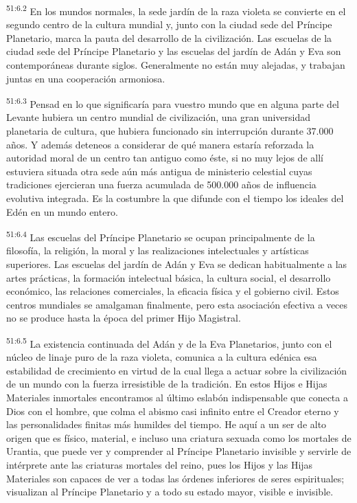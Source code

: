\par
\textsuperscript{51:6.2} En los mundos normales, la sede jardín de la raza violeta se convierte en el segundo centro de la cultura mundial y, junto con la ciudad sede del Príncipe Planetario, marca la pauta del desarrollo de la civilización. Las escuelas de la ciudad sede del Príncipe Planetario y las escuelas del jardín de Adán y Eva son contemporáneas durante siglos. Generalmente no están muy alejadas, y trabajan juntas en una cooperación armoniosa.

\par
\textsuperscript{51:6.3} Pensad en lo que significaría para vuestro mundo que en alguna parte del Levante hubiera un centro mundial de civilización, una gran universidad planetaria de cultura, que hubiera funcionado sin interrupción durante 37.000 años. Y además deteneos a considerar de qué manera estaría reforzada la autoridad moral de un centro tan antiguo como éste, si no muy lejos de allí estuviera situada otra sede aún más antigua de ministerio celestial cuyas tradiciones ejercieran una fuerza acumulada de 500.000 años de influencia evolutiva integrada. Es la costumbre la que difunde con el tiempo los ideales del Edén en un mundo entero.

\par
\textsuperscript{51:6.4} Las escuelas del Príncipe Planetario se ocupan principalmente de la filosofía, la religión, la moral y las realizaciones intelectuales y artísticas superiores. Las escuelas del jardín de Adán y Eva se dedican habitualmente a las artes prácticas, la formación intelectual básica, la cultura social, el desarrollo económico, las relaciones comerciales, la eficacia física y el gobierno civil. Estos centros mundiales se amalgaman finalmente, pero esta asociación efectiva a veces no se produce hasta la época del primer Hijo Magistral.

\par
\textsuperscript{51:6.5} La existencia continuada del Adán y de la Eva Planetarios, junto con el núcleo de linaje puro de la raza violeta, comunica a la cultura edénica esa estabilidad de crecimiento en virtud de la cual llega a actuar sobre la civilización de un mundo con la fuerza irresistible de la tradición. En estos Hijos e Hijas Materiales inmortales encontramos al último eslabón indispensable que conecta a Dios con el hombre, que colma el abismo casi infinito entre el Creador eterno y las personalidades finitas más humildes del tiempo. He aquí a un ser de alto origen que es físico, material, e incluso una criatura sexuada como los mortales de Urantia, que puede ver y comprender al Príncipe Planetario invisible y servirle de intérprete ante las criaturas mortales del reino, pues los Hijos y las Hijas Materiales son capaces de ver a todas las órdenes inferiores de seres espirituales; visualizan al Príncipe Planetario y a todo su estado mayor, visible e invisible.

